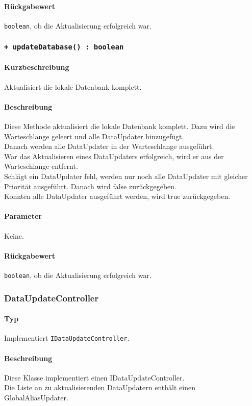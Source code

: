 \paragraph*{Rückgabewert}
\texttt{boolean}, ob die Aktualisierung erfolgreich war.

\subsubsection*{\texttt{+ updateDatabase() : boolean}}\label{App_DocumentViewer_IDataupdateController_updateDatabase}%
\paragraph*{Kurzbeschreibung}
Aktualisiert die lokale Datenbank komplett.
\paragraph*{Beschreibung}
Diese Methode aktualisiert die lokale Datenbank komplett. 
Dazu wird die Warteschlange geleert und alle DataUpdater hinzugefügt.\\
Danach werden alle DataUpdater in der Warteschlange ausgeführt.\\
War das Aktualisieren eines DataUpdaters erfolgreich, wird er aus der Warteschlange entfernt.\\
Schlägt ein DataUpdater fehl, werden nur noch alle DataUpdater mit gleicher Priorität 
ausgeführt. Danach wird false zurückgegeben.\\
Konnten alle DataUpdater ausgeführt werden, wird true zurückgegeben.
\paragraph*{Parameter}
Keine.
\paragraph*{Rückgabewert}
\texttt{boolean}, ob die Aktualisierung erfolgreich war.

\subsubsection{DataUpdateController}\label{App_DocumentViewer_DataupdateController}
\paragraph*{Typ}
Implementiert \texttt{IDataUpdateController}.
\paragraph*{Beschreibung}
Diese Klasse implementiert einen IDataUpdateController.\\
Die Liste an zu aktualisierenden DataUpdatern enthält einen GlobalAliasUpdater.
